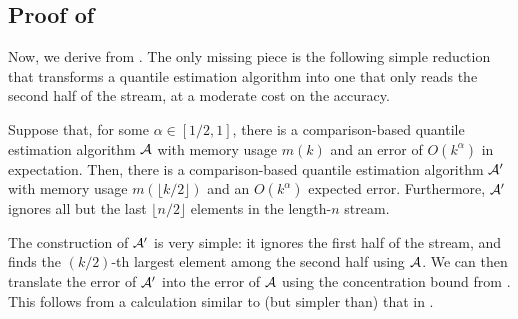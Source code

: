 \subsection{Proof of }\label{sec:reduction-stronger}
Now, we derive  from . The only missing piece is the following simple reduction that transforms a quantile estimation algorithm into one that only reads the second half of the stream, at a moderate cost on the accuracy.

\begin{lemma}\label{lemma:only-read-second-half}
    Suppose that, for some $\alpha \in [1/2, 1]$, there is a comparison-based quantile estimation algorithm $\mathcal{A}$ with memory usage $m(k)$ and an error of $O(k^{\alpha})$ in expectation. Then, there is a comparison-based quantile estimation algorithm $\mathcal{A}'$ with memory usage $m(\lfloor k/2\rfloor)$ and an $O(k^{\alpha})$ expected error. Furthermore, $\mathcal{A}'$ ignores all but the last $\lfloor n/2\rfloor$ elements in the length-$n$ stream.
\end{lemma}

The construction of $\mathcal{A}'$ is very simple: it ignores the first half of the stream, and finds the $(k/2)$-th largest element among the second half using $\mathcal{A}$. We can then translate the error of $\mathcal{A}'$ into the error of $\mathcal{A}$ using the concentration bound from . This follows from a calculation similar to (but simpler than) that in .


